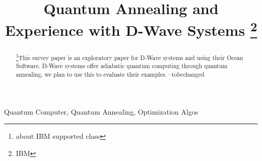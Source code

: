 \documentclass[12pt,conference]{IEEEtran}
\begin{document}
\title{Quantum Annealing and Experience with D-Wave Systems \thanks{IBM}}


\author{
\and
{}
}


\maketitle

\begin{abstract}
\footnote  { about IBM supported class}This survey paper is an exploratory paper for D-Wave systems and using their Ocean Software. D-Wave systems offer adiabatic quantum computing through quantum annealing, we plan to use this to evaluate their examples. --tobechanged
\end{abstract}

\begin{IEEEkeywords}
Quantum Computer, Quantum Annealing, Optimization Algos
\end{IEEEkeywords}
\end{document}
